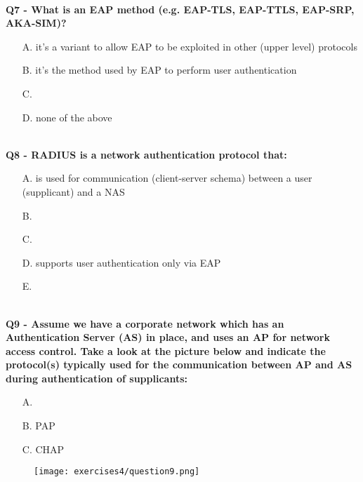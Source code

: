 \textbf{\\Q7 - What is an EAP method (e.g. EAP-TLS, EAP-TTLS, EAP-SRP, AKA-SIM)?}
\begin{itemize}
    \item[A.] it's a variant to allow EAP to be exploited in other (upper level) protocols
    \item[B.] it's the method used by EAP to perform user authentication
    \item[C.] 
    \item[D.] none of the above
\end{itemize}
\com{}

\textbf{\\Q8 - RADIUS is a network authentication protocol that:}
\begin{itemize}
    \item[A.] is used for communication (client-server schema) between a user (supplicant) and a NAS
    \item[B.] 
    \item[C.] 
    \item[D.] supports user authentication only via EAP
    \item[E.] 
\end{itemize}

\textbf{\\Q9 - Assume we have a corporate network which has an Authentication Server (AS) in place, and uses an AP for network access control. 
Take a look at the picture below and indicate the protocol(s) typically used for the communication between AP and AS during authentication of supplicants:}
\begin{itemize}
    \item[A.] 
    \item[B.] PAP
    \item[C.] CHAP
\end{itemize}
\begin{figure}[h]
    \centering
    \texttt{[image: exercises4/question9.png]}
\end{figure}
\com{}


